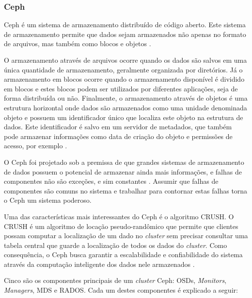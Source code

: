 \subsubsection{Ceph}

Ceph é um sistema de armazenamento distribuído de código aberto. Este sistema de armazenamento permite que dados sejam armazenados não apenas no formato de arquivos, mas também como blocos e objetos \cite{cephdocumentation}.

O armazenamento através de arquivos ocorre quando os dados são salvos em uma única quantidade de armazenamento, geralmente organizada por diretórios. Já o armazenamento em blocos ocorre quando o armazenamento disponível é dividido em blocos e estes blocos podem ser utilizados por diferentes aplicações, seja de forma distribuída ou não. Finalmente, o armazenamento através de objetos é uma estrutura horizontal onde dados são armazenados como uma unidade denominada objeto e possuem um identificador único que localiza este objeto na estrutura de dados. Este identificador é salvo em um servidor de metadados, que também pode armazenar informações como data de criação do objeto e permissões de acesso, por exemplo \cite{redhatStorage}.

O Ceph foi projetado sob a premissa de que grandes sistemas de armazenamento de dados possuem o potencial de armazenar ainda mais informações, e falhas de componentes não são exceções, e sim constantes \cite{cephFailures}. Assumir que falhas de componentes são comuns no sistema e trabalhar para contornar estas falhas torna o Ceph um sistema poderoso.

Uma das características mais interessantes do Ceph é o algoritmo \ac{CRUSH}. O \ac{CRUSH} é um algoritmo de locação pseudo-randômico que permite que clientes possam computar a localização de um dado no \textit{cluster} sem precisar consultar uma tabela central que guarde a localização de todos os dados do \textit{cluster}. Como consequência, o Ceph busca garantir a escalabilidade e confiabilidade do sistema através da computação inteligente dos dados nele armazenados \cite{cephPerformance}.

Cinco são os componentes principais de um \textit{cluster} Ceph: \ac{OSD}s, \textit{Monitors}, \textit{Managers}, \ac{MDS} e \ac{RADOS}. Cada um destes componentes é explicado a seguir:

